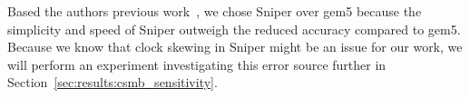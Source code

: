 Based the authors previous work~\cite{Olsen2014}, we chose Sniper over gem5 because the simplicity and speed of Sniper outweigh the reduced accuracy compared to gem5.
Because we know that clock skewing in Sniper might be an issue for our work, we will perform an experiment investigating this error source further in Section~\ref{sec:results:csmb_sensitivity}.